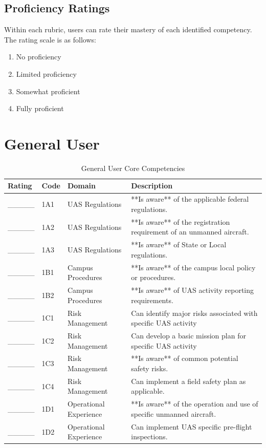 \documentclass[
]{book}
\providecommand{\tightlist}{%
  \setlength{\itemsep}{0pt}\setlength{\parskip}{0pt}}
\begin{document}
\hypertarget{proficiency-ratings}{%
\subsection{Proficiency Ratings}\label{proficiency-ratings}}

Within each rubric, users can rate their mastery of each identified competency. The rating scale is as follows:

\begin{enumerate}
\def\labelenumi{\arabic{enumi}.}
\tightlist
\item
  No proficiency
\item
  Limited proficiency
\item
  Somewhat proficient
\item
  Fully proficient
\end{enumerate}

\hypertarget{general-user}{%
\section{General User}\label{general-user}}

\begin{longtable}[t]{lll>{\raggedright\arraybackslash}p{25em}}
\caption{\label{tab:unnamed-chunk-4}General User Core Competencies}\\
\toprule
Rating & Code & Domain & Description\\
\midrule
\_\_\_\_\_ & 1A1 & UAS Regulations & **Is aware** of the applicable federal regulations.\\
\_\_\_\_\_ & 1A2 & UAS Regulations & **Is aware** of the registration requirement of an unmanned aircraft.\\
\_\_\_\_\_ & 1A3 & UAS Regulations & **Is aware** of State or Local regulations.\\
\_\_\_\_\_ & 1B1 & Campus Procedures & **Is aware** of the campus local policy or procedures.\\
\_\_\_\_\_ & 1B2 & Campus Procedures & **Is aware** of UAS activity reporting requirements.\\
\addlinespace
\_\_\_\_\_ & 1C1 & Risk Management & Can identify major risks associated with specific UAS activity\\
\_\_\_\_\_ & 1C2 & Risk Management & Can develop a basic mission plan for specific UAS activity\\
\_\_\_\_\_ & 1C3 & Risk Management & **Is aware** of common potential safety risks.\\
\_\_\_\_\_ & 1C4 & Risk Management & Can implement a field safety plan as applicable.\\
\_\_\_\_\_ & 1D1 & Operational Experience & **Is aware** of the operation and use of specific unmanned aircraft.\\
\addlinespace
\_\_\_\_\_ & 1D2 & Operational Experience & Can implement UAS specific pre-flight inspections.\\
\bottomrule
\end{longtable}
\end{document}
